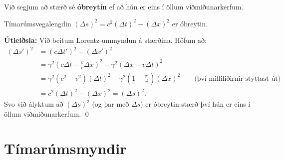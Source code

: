 \ifdefined \wholebook \else\documentclass[oneside]{book}\usepackage{EdlBook}\graphicspath{{figures/}}
\begin{document}
\begin{tcolorbox}
\begin{definition}
Við segjum að stærð sé \textbf{óbreytin} ef að hún er eins í öllum viðmiðunarkerfum.
\end{definition}
\end{tcolorbox}


\begin{tcolorbox}
\begin{theorem}
Tímarúmsvegalengdin $(\Delta s)^2 = c^2 (\Delta t)^2 - (\Delta x)^2$ er óbreytin.
\end{theorem}
\end{tcolorbox}

\textbf{Útleiðsla:} Við beitum Lorentz-ummyndun á stærðina. Höfum að:
\begin{align*}
    (\Delta s')^2 &= (c\Delta t')^2 - (\Delta x')^2 \\ &= \gamma^2 \left( c \Delta t - \frac{v}{c} \Delta x \right)^2 - \gamma^2 \left( \Delta x - v\Delta t \right)^2 \\
    &= \gamma^2(c^2-v^2)(\Delta t)^2 - \gamma^2\left(1 - \frac{v^2}{c^2}\right)(\Delta x)^2 \qquad \text{(því milliliðirnir styttast út)} \\
    &= c^2 (\Delta t)^2 - (\Delta x)^2 = (\Delta s)^2.
\end{align*}
Svo við ályktum að $(\Delta s)^2$ (og þar með $\Delta s$) er óbreytin stærð því hún er eins í öllum viðmiðunarkerfum. \qed

\newpage

\section{Tímarúmsmyndir}
\end{document}
